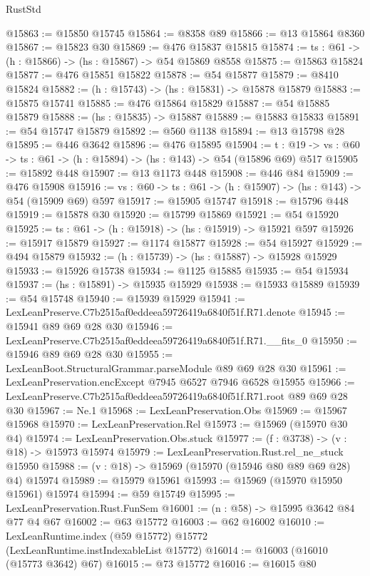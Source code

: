 \begin{lexlean}{RustStd}
\begin{coremodule}
@15863 := @15850 @15745
@15864 := @8358 @89
@15866 := @13 @15864 @8360
@15867 := @15823 @30
@15869 := @476 @15837 @15815
@15874 := {ts : @61} -> (h : @15866) -> (hs : @15867) -> @54 @15869 @8558
@15875 := @15863 @15824
@15877 := @476 @15851 @15822
@15878 := @54 @15877
@15879 := @8410 @15824
@15882 := (h : @15743) -> (hs : @15831) -> @15878 @15879
@15883 := @15875 @15741
@15885 := @476 @15864 @15829
@15887 := @54 @15885 @15879
@15888 := (hs : @15835) -> @15887
@15889 := @15883 @15833
@15891 := @54 @15747 @15879
@15892 := @560 @1138
@15894 := @13 @15798 @28
@15895 := @446 @3642
@15896 := @476 @15895
@15904 := {t : @19} ->
  {vs : @60} -> {ts : @61} -> (h : @15894) -> (hs : @143) -> @54 (@15896 @69) @517
@15905 := @15892 @448
@15907 := @13 @1173 @448
@15908 := @446 @84
@15909 := @476 @15908
@15916 := {vs : @60} -> {ts : @61} -> (h : @15907) -> (hs : @143) -> @54 (@15909 @69) @597
@15917 := @15905 @15747
@15918 := @15796 @448
@15919 := @15878 @30
@15920 := @15799 @15869
@15921 := @54 @15920
@15925 := {ts : @61} -> (h : @15918) -> (hs : @15919) -> @15921 @597
@15926 := @15917 @15879
@15927 := @1174 @15877
@15928 := @54 @15927
@15929 := @494 @15879
@15932 := (h : @15739) -> (hs : @15887) -> @15928 @15929
@15933 := @15926 @15738
@15934 := @1125 @15885
@15935 := @54 @15934
@15937 := (hs : @15891) -> @15935 @15929
@15938 := @15933 @15889
@15939 := @54 @15748
@15940 := @15939 @15929
@15941 := LexLeanPreserve.C7b2515af0eddeea59726419a6840f51f.R71.denote
@15945 := @15941 @89 @69 @28 @30
@15946 := LexLeanPreserve.C7b2515af0eddeea59726419a6840f51f.R71.__fits_0
@15950 := @15946 @89 @69 @28 @30
@15955 := LexLeanBoot.StructuralGrammar.parseModule @89 @69 @28 @30
@15961 := LexLeanPreservation.encExcept @7945 @6527 @7946 @6528 @15955
@15966 := LexLeanPreserve.C7b2515af0eddeea59726419a6840f51f.R71.root @89 @69 @28 @30
@15967 := Ne.{1}
@15968 := LexLeanPreservation.Obs
@15969 := @15967 @15968
@15970 := LexLeanPreservation.Rel
@15973 := @15969 (@15970 @30 @4)
@15974 := LexLeanPreservation.Obs.stuck
@15977 := (f : @3738) -> (v : @18) -> @15973 @15974
@15979 := LexLeanPreservation.Rust.rel_ne_stuck @15950
@15988 := (v : @18) -> @15969 (@15970 (@15946 @80 @89 @69 @28) @4) @15974
@15989 := @15979 @15961
@15993 := @15969 (@15970 @15950 @15961) @15974
@15994 := @59 @15749
@15995 := LexLeanPreservation.Rust.FunSem
@16001 := (n : @58) -> @15995 @3642 @84 @77 @4 @67
@16002 := @63 @15772
@16003 := @62 @16002
@16010 := LexLeanRuntime.index (@59 @15772) @15772 (LexLeanRuntime.instIndexableList @15772)
@16014 := @16003 (@16010 (@15773 @3642) @67)
@16015 := @73 @15772
@16016 := @16015 @80

\end{coremodule}
\end{lexlean}
